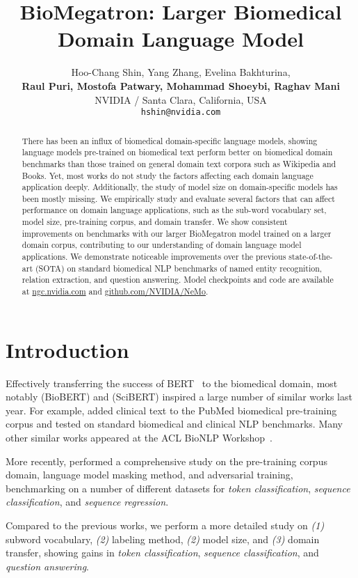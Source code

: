 \documentclass[11pt,a4paper]{article}
\title{BioMegatron: Larger Biomedical Domain Language Model}
\author{Hoo-Chang Shin, Yang Zhang, Evelina Bakhturina,\\
  \textbf{Raul Puri, Mostofa Patwary, Mohammad Shoeybi, Raghav Mani}
 \\
  NVIDIA / Santa Clara, California, USA \\
  \texttt{hshin@nvidia.com} \\}
\date{}
\begin{document}
\maketitle
\begin{abstract}
There has been an influx of biomedical domain-specific language models, showing language models pre-trained on biomedical text perform better on biomedical domain benchmarks than those trained on general domain text corpora such as Wikipedia and Books.
Yet, most works do not study the factors affecting each domain language application deeply.
Additionally, the study of model size on domain-specific models has been mostly missing.
We empirically study and evaluate several factors that can affect performance on domain language applications, such as the sub-word vocabulary set, model size, pre-training corpus, and domain transfer.
We show consistent improvements on benchmarks with our larger BioMegatron model trained on a larger domain corpus, contributing to our understanding of domain language model applications.
We demonstrate noticeable improvements over the previous state-of-the-art (SOTA) on standard biomedical NLP benchmarks of named entity recognition, relation extraction, and question answering.
Model checkpoints and code are available at \url{ngc.nvidia.com} and \url{github.com/NVIDIA/NeMo}.
\end{abstract}


\section{Introduction}

Effectively transferring the success of BERT~\citep{devlin2018bert} to the biomedical domain, most notably \citet{lee2019biobert} (BioBERT) and \citet{beltagy2019scibert} (SciBERT) inspired a large number of similar works last year.
For example, \citet{peng2019transfer,alsentzer2019publicly,huang2019clinicalbert} added clinical text to the PubMed biomedical pre-training corpus and tested on standard biomedical and clinical NLP benchmarks.
Many other similar works appeared at the ACL BioNLP Workshop~\citep{demner2019proceedings}.

More recently, \citet{gu2020domain} performed a comprehensive study on the pre-training corpus domain, language model masking method, and adversarial training, benchmarking on a number of different datasets for \textit{token classification}, \textit{sequence classification}, and \textit{sequence regression}.

Compared to the previous works, we perform a more detailed study on \textit{(1)} subword vocabulary, \textit{(2)} labeling method, \textit{(2)} model size, and \textit{(3)} domain transfer, showing gains in \textit{token classification}, \textit{sequence classification}, and \textit{question answering}.
\end{document}
